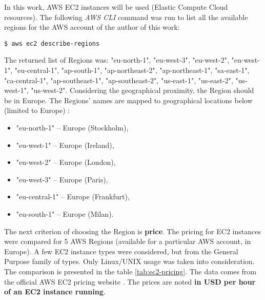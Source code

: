 In this work, AWS EC2 instances will be used (Elastic Compute Cloud resources). The following \textit{AWS CLI} command was run to list all the available regions for the AWS account of the author of this work:
\begin{lstlisting}[basicstyle=\small,caption={A command of \textit{AWS CLI} tool used to list all the available regions (for an AWS account)}]
$ aws ec2 describe-regions
\end{lstlisting}

The returned list of Regions was: "eu-north-1", "eu-west-3", "eu-west-2", "eu-west-1", "eu-central-1", "ap-south-1", "ap-northeast-2", "ap-northeast-1", "sa-east-1", "ca-central-1", "ap-southeast-1", "ap-southeast-2", "us-east-1", "us-east-2", "us-west-1", "us-west-2". Considering the geographical proximity, the Region should be in Europe. The Regions' names are mapped to geographical locations below (limited to Europe) \cite{aws-region-map}:
\begin{itemize}
\item "eu-north-1" -- Europe (Stockholm),
\item "eu-west-1" -- Europe (Ireland),
\item "eu-west-2" -- Europe (London),
\item "eu-west-3" -- Europe (Paris),
\item "eu-central-1" -- Europe (Frankfurt),
\item "eu-south-1" -- Europe (Milan).
\end{itemize}

The next criterion of choosing the Region is \textbf{price}. The pricing for EC2 instances were compared for 5 AWS Regions (available for a particular AWS account, in Europe). A few EC2 instance types were considered, but from the General Purpose family of types. Only Linux/UNIX usage was taken into consideration. The comparison is presented in the table \ref{tab:ec2-pricing}. The data comes from the official AWS EC2 pricing website \cite{ec2-pricing}. The prices are noted \textbf{in USD per hour of an EC2 instance running}.

